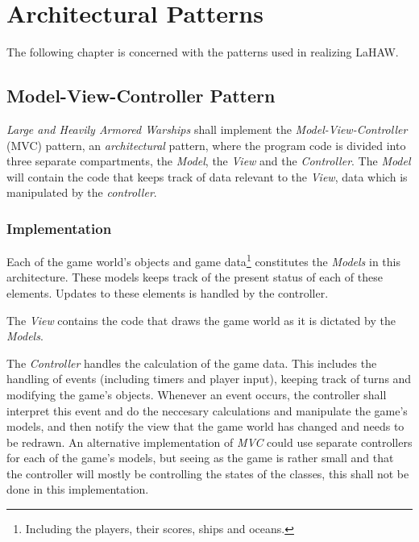 \chapter{Architectural Patterns}
\label{chapter:patterns}
The following chapter is concerned with the patterns used in realizing LaHAW.


    \section{Model-View-Controller Pattern}
    \emph{Large and Heavily Armored Warships} shall implement the \emph{Model-View-Controller} (MVC) pattern, an \emph{architectural} pattern, where the program code is divided into three separate compartments, the \emph{Model}, the \emph{View} and the \emph{Controller}. The \emph{Model} will contain the code that keeps track of data relevant to the \emph{View}, data which is manipulated by the \emph{controller}.
    
        \subsection{Implementation}
        Each of the game world's objects and game data\footnote{Including the players, their scores, ships and oceans.} constitutes the \emph{Models} in this architecture. These models keeps track of the present status of each of these elements. Updates to these elements is handled by the controller.
    
        The \emph{View} contains the code that draws the game world as it is dictated by the \emph{Models}.
    
        The \emph{Controller} handles the calculation of the game data. This includes the handling of events (including timers and player input), keeping track of turns and modifying the game's objects.
        Whenever an event occurs, the controller shall interpret this event and do the neccesary calculations and manipulate the game's models, and then notify the view that the game world has changed and needs to be redrawn.
        An alternative implementation of \emph{MVC} could use separate controllers for each of the game's models, but seeing as the game is rather small and that the controller will mostly be controlling the states of the classes, this shall not be done in this implementation.


